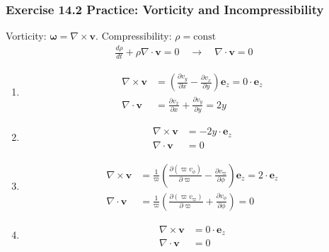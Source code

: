 \documentclass[10pt,a4paper]{book}
\theoremstyle{definition}
\begin{document}
\subsubsection{Exercise 14.2 Practice: Vorticity and Incompressibility}
Vorticity: $\boldsymbol\omega=\nabla\times\mathbf{v}$. Compressibility: $\rho=\text{const}$
\begin{align}
    \frac{d\rho}{dt}+\rho\nabla\cdot\mathbf{v}=0\quad\rightarrow\quad\nabla\cdot\mathbf{v}=0
\end{align}
\begin{enumerate}[label=(\alph*)]
    \item 
    \begin{align}
        \nabla\times\mathbf{v} &=\left(\frac{\partial v_y}{\partial x}-\frac{\partial v_x}{\partial y}\right)\mathbf{e}_z= 0\cdot\mathbf{e}_z\\
        \nabla\cdot\mathbf{v} &= \frac{\partial v_x}{\partial x}+\frac{\partial v_y}{\partial y}=2y
    \end{align}
    \item 
    \begin{align}
        \nabla\times\mathbf{v} &= -2y\cdot\mathbf{e}_z\\
        \nabla\cdot\mathbf{v} &= 0
    \end{align}
    \item 
    \begin{align}
        \nabla\times\mathbf{v} &= \frac{1}{\varpi}\left(\frac{\partial (\varpi v_\phi)}{\partial \varpi}-\frac{\partial v_\varpi}{\partial \phi}\right)\mathbf{e}_z= 2\cdot\mathbf{e}_z\\
        \nabla\cdot\mathbf{v} &= \frac{1}{\varpi}\left(\frac{\partial (\varpi v_\varpi)}{\partial \varpi}+\frac{\partial v_\phi}{\partial \phi}\right)=0
    \end{align}
    \item 
    \begin{align}
        \nabla\times\mathbf{v} &=  0\cdot\mathbf{e}_z\\
        \nabla\cdot\mathbf{v} &= 0
    \end{align}
\end{enumerate}
\end{document}
